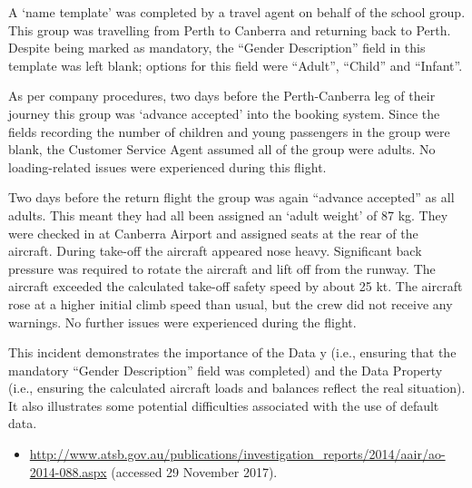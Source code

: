 A `name template' was completed by a travel agent on behalf of the school group. This group was travelling from Perth to Canberra and returning back to Perth. Despite being marked as mandatory, the ``Gender Description'' field in this template was left blank; options for this field were ``Adult'', ``Child'' and ``Infant''.

As per company procedures, two days before the Perth-Canberra leg of their journey this group was `advance accepted' into the booking system. Since the fields recording the number of children and young passengers in the group were blank, the Customer Service Agent assumed all of the group were adults. No loading-related issues were experienced during this flight.

Two days before the return flight the group was again ``advance accepted'' as all adults. This meant they had all been assigned an `adult weight' of 87 kg. They were checked in at Canberra Airport and assigned seats at the rear of the aircraft. During take-off the aircraft appeared nose heavy. Significant back pressure was required to rotate the aircraft and lift off from the runway. The aircraft exceeded the calculated take-off safety speed by about 25 kt. The aircraft rose at a higher initial climb speed than usual, but the crew did not receive any warnings. No further issues were experienced during the flight.

This incident demonstrates the importance of the  Data y (i.e., ensuring that the mandatory ``Gender Description'' field was completed) and the  Data Property (i.e., ensuring the calculated aircraft loads and balances reflect the real situation). It also illustrates some potential difficulties associated with the use of default data.

\begin{samepage}
\begin{itemize}
  \item \raggedright{\href{http://www.atsb.gov.au/publications/investigation_reports/2014/aair/ao-2014-088.aspx}{http://www.atsb.gov.au/publications/investigation\_reports/2014/aair/ao-2014-088.aspx} (accessed 29 November 2017).}
\end{itemize}
\end{samepage}


